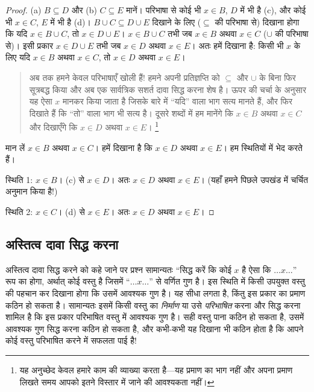 \documentclass[../../../include/open-logic-section]{subfiles}
\begin{document}
\begin{proof}
  (a) $B\subseteq D$ और (b) $C\subseteq E$ मानें। परिभाषा से कोई भी
  $x\in B$, $D$ में भी है (c), और कोई भी $x\in C$, $E$ में भी है (d)।
  $B\cup C\subseteq D\cup E$ दिखाने के लिए ($\subseteq$ की परिभाषा से)
  दिखाना होगा कि यदि $x\in B\cup C$, तो $x\in D\cup E$। $x\in B\cup C$
  तभी जब $x\in B$ अथवा $x\in C$ ($\cup$ की परिभाषा से)। इसी प्रकार
  $x\in D\cup E$ तभी जब $x\in D$ अथवा $x\in E$। अतः हमें दिखाना है: किसी
  भी $x$ के लिए यदि $x\in B$ अथवा $x\in C$, तो $x\in D$ अथवा $x\in E$।

  \begin{quote}
  अब तक हमने केवल परिभाषाएँ खोली हैं!{} हमने अपनी प्रतिज्ञप्ति को
  $\subseteq$ और $\cup$ के बिना फिर सूत्रबद्ध किया और अब एक सार्वत्रिक
  सशर्त दावा सिद्ध करना शेष है। ऊपर की चर्चा के अनुसार यह ऐसा $x$ मानकर
  किया जाता है जिसके बारे में ``यदि'' वाला भाग सत्य मानते हैं, और फिर
  दिखाते हैं कि ``तो'' वाला भाग भी सत्य है। दूसरे शब्दों में हम मानेंगे कि
  $x\in B$ अथवा $x\in C$ और दिखाएँगे कि $x\in D$ अथवा $x\in E$।
  \footnote{यह अनुच्छेद केवल हमारे काम की व्याख्या करता है---यह प्रमाण का
  भाग नहीं और अपना प्रमाण लिखते समय आपको इतने विस्तार में जाने की आवश्यकता
  नहीं।}
  \end{quote}

  मान लें $x\in B$ अथवा $x\in C$। हमें दिखाना है कि $x\in D$ अथवा
  $x\in E$। हम स्थितियों में भेद करते हैं।

  स्थिति 1: $x\in B$। (c) से $x\in D$। अतः $x\in D$ अथवा $x\in E$।
  (यहाँ हमने पिछले उपखंड में चर्चित अनुमान किया है!)
      
  स्थिति 2: $x\in C$। (d) से $x\in E$। अतः $x\in D$ अथवा $x\in E$।
 \end{proof}


\subsection{अस्तित्व दावा सिद्ध करना}

अस्तित्व दावा सिद्ध करने को कहे जाने पर प्रश्न सामान्यतः ``सिद्ध करें कि
कोई $x$ है ऐसा कि $\dots x\dots$'' रूप का होगा, अर्थात् कोई वस्तु है जिसमें
``$\dots x\dots$'' से वर्णित गुण है। इस स्थिति में किसी उपयुक्त वस्तु की
पहचान कर दिखाना होगा कि उसमें आवश्यक गुण है। यह सीधा लगता है, किंतु इस
प्रकार का प्रमाण कठिन हो सकता है। सामान्यतः इसमें किसी वस्तु का
\emph{निर्माण} या उसे \emph{परिभाषित} करना और सिद्ध करना शामिल है कि इस
प्रकार परिभाषित वस्तु में आवश्यक गुण है। सही वस्तु पाना कठिन हो सकता है,
उसमें आवश्यक गुण सिद्ध करना कठिन हो सकता है, और कभी-कभी यह दिखाना भी कठिन
होता है कि आपने कोई वस्तु परिभाषित करने में सफलता पाई है!{}
\end{document}
